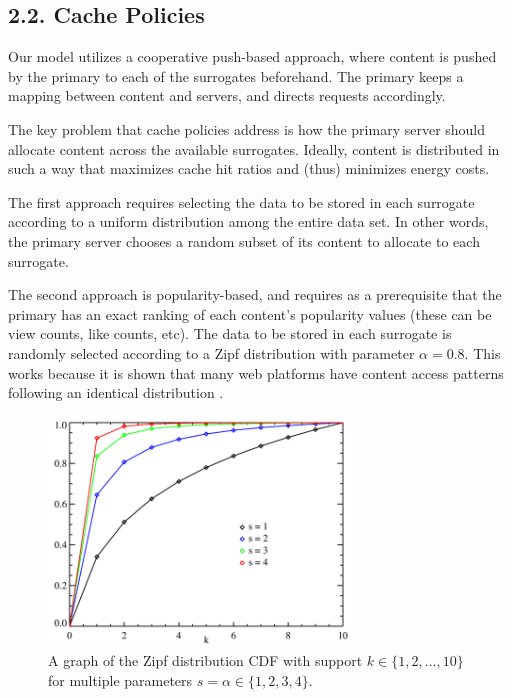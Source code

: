 \documentclass[
	a4paper, %
	10pt, %
	unnumberedsections, %
	twoside, %
]{LTJournalArticle}
\begin{document}

\subsection{2.2. Cache Policies}
Our model utilizes a cooperative push-based approach, where content is pushed by the primary to each of the surrogates beforehand. The primary keeps a mapping between content and servers, and directs requests accordingly. 

The key problem that cache policies address is how the primary server should allocate content across the available surrogates. Ideally, content is distributed in such a way that maximizes cache hit ratios and (thus) minimizes energy costs.

The first approach requires selecting the data to be stored in each surrogate according to a uniform distribution among the entire data set. In other words, the primary server chooses a random subset of its content to allocate to each surrogate. 

The second approach is popularity-based, and requires as a prerequisite that the primary has an exact ranking of each content's popularity values (these can be view counts, like counts, etc). The data to be stored in each surrogate is randomly selected according to a Zipf distribution with parameter $\alpha = 0.8$. This works because it is shown that many web platforms have content access patterns following an identical distribution \cite{749260}.

\begin{figure}[h]
	\begin{center}
		\includegraphics[width=8.1cm]{zipf.png}
	\end{center}
	\caption{A graph of the Zipf distribution CDF with support $k\in\{1, 2, \ldots, 10 \}$ for multiple parameters $s=\alpha \in \{1,2,3,4\}$.}
\end{figure}
\end{document}
